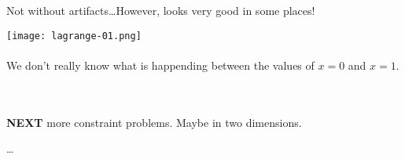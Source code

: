 \documentclass[12pt]{article}
\begin{document}
\newpage

\noindent Not without artifacts\dots However, looks very good in some places!

\texttt{[image: lagrange-01.png]} \\ \\
We don't really know what is happending between the values of $x = 0$ and $x = 1$.  \\
 \\ \\
\textbf{NEXT} more constraint problems.  Maybe in two dimensions.

\newpage  

\begin{thebibliography}{}

\item \dots 

\end{thebibliography}
\end{document}
